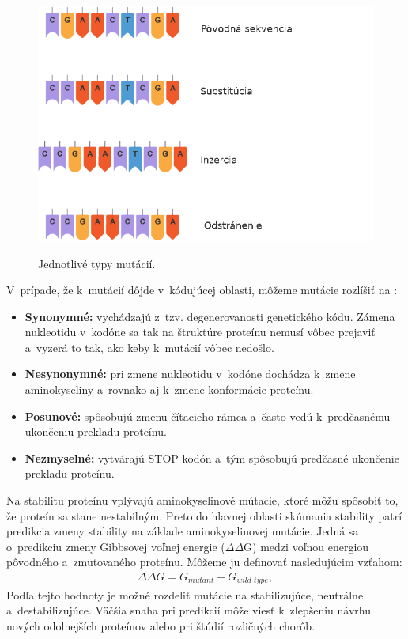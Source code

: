 \begin{figure}[H]
	\centering
	\begin{center}
		\scalebox{0.6}
		{   
			\includegraphics{mutation_types.png}
		}
		\caption[mutacie]{Jednotlivé typy mutácií\footnotemark.}
	\end{center}
\end{figure}

V~prípade, že k~mutácií dôjde v~kódujúcej oblasti, môžeme mutácie rozlíšiť na \cite{flegr}:
\begin{itemize}
	\item \textbf{Synonymné:} vychádzajú z~tzv. degenerovanosti genetického kódu. Zámena nukleotidu v~kodóne sa tak na štruktúre proteínu nemusí vôbec prejaviť a~vyzerá to tak, ako keby k~mutácií vôbec nedošlo. 
	\item \textbf{Nesynonymné:} pri zmene nukleotidu v~kodóne dochádza k~zmene aminokyseliny a~rovnako aj k~zmene konformácie proteínu.
	\item \textbf{Posunové:} spôsobujú zmenu čítacieho rámca a~často vedú k~predčasnému ukončeniu prekladu proteínu.
	\item \textbf{Nezmyselné:} vytvárajú STOP kodón a~tým spôsobujú predčasné ukončenie prekladu proteínu.
\end{itemize}
\newpage
Na stabilitu proteínu vplývajú aminokyselinové mútacie, ktoré môžu spôsobiť to, že proteín sa stane nestabilným. Preto do hlavnej oblasti skúmania stability patrí predikcia zmeny stability na základe aminokyselinovej mutácie. Jedná sa o~predikciu zmeny Gibbsovej voľnej energie ($\Delta\Delta$G) medzi voľnou energiou pôvodného a~zmutovaného proteínu. Môžeme ju definovať nasledujúcim vzťahom:
\begin{align}
	\Delta\Delta G = G_{mutant} - G_{wild\_type},
\end{align}
Podľa tejto hodnoty je možné rozdeliť mutácie na stabilizujúce, neutrálne a~destabilizujúce. Väčšia snaha pri predikcií môže viesť k~zlepšeniu návrhu nových odolnejších proteínov alebo pri štúdií rozličných chorôb.


